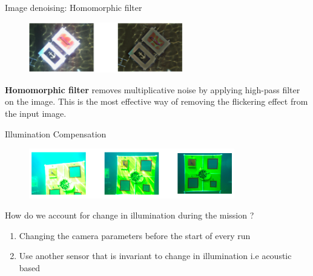 \documentclass[13pt]{beamer}
\begin{document}
\begin{frame}{Image denoising: Homomorphic filter}

  \begin{figure}[ht]
      \centering
      \includegraphics[width=0.6\textwidth, height=0.3\textwidth]{figs/homomorphic.png}
  \end{figure}

  \textbf{Homomorphic filter} removes multiplicative noise by applying high-pass
  filter on the image. This is the most effective way of removing the flickering
  effect from the input image.

\end{frame}

\begin{frame}{Illumination Compensation}

  \begin{figure}[ht]
      \centering
      \includegraphics[width=0.8\textwidth, height=0.3\textwidth]{figs/illumcompensation.png}
  \end{figure}

  How do we account for change in illumination during the mission ?

  \begin{enumerate}
    \item Changing the camera parameters before the start of every run
    \item Use another sensor that is invariant to change in illumination i.e
      acoustic based
  \end{enumerate}
  
\end{frame}
\end{document}
